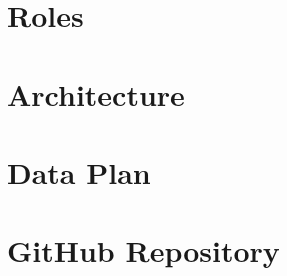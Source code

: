 \documentclass[12pt]{article}
\begin{document}
\section{Roles}


\section{Architecture}




\section{Data Plan}



\section{GitHub Repository}








 
\end{document}
